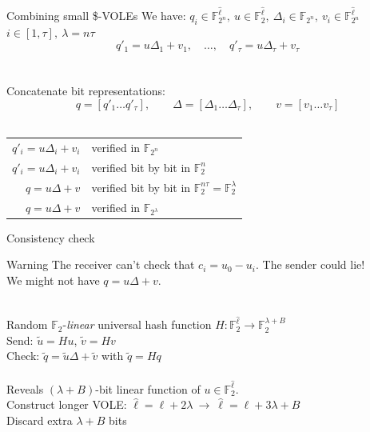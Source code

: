\begin{frame}{Combining small \$-VOLEs}
  We have: $q_i\in \mathbb{F}_{2^n}^{\hat{\ell}},\ u\in \mathbb{F}_2^{\hat{\ell}},\ \Delta_i\in \mathbb{F}_{2^n},\ v_i\in \mathbb{F}_{2^n}^{\hat{\ell}}$
  \hfill $i\in [1,\tau],\ \lambda=n\tau$\\
  $$q'_1=u\Delta_1+v_1,\quad\ldots,\quad q'_\tau=u\Delta_\tau+v_\tau$$
  \ \\\ \\\pause
  Concatenate bit representations:
  \vspace{-1em}
  $$q=[q'_1\ldots q'_\tau],\qquad\Delta=[\Delta_1\ldots\Delta_\tau],\qquad v=[v_1\ldots v_\tau]$$
  \ \\[1em]\pause
  \begin{center}
    \begin{tabular}{rl}
      $q'_i=u\Delta_i+v_i$ & verified in $\mathbb{F}_{2^n}$\\
      \pause
      $q'_i=u\Delta_i+v_i$ & verified bit by bit in $\mathbb{F}_2^n$\\
      \pause
      $q=u\Delta+v$ & verified bit by bit in $\mathbb{F}_2^{n\tau}=\mathbb{F}_2^\lambda$\\
      \pause
      $q=u\Delta+v$ & verified in $\mathbb{F}_{2^\lambda}$\\
    \end{tabular}
  \end{center}
\end{frame}


\begin{frame}{Consistency check}
  \begin{alertblock}{Warning}
    The receiver can't check that $c_i=u_0-u_i$.
    The sender could lie!\\
    We might not have $q=u\Delta+v$.
  \end{alertblock}
  \pause
  \ \\
  Random $\mathbb{F}_2$-\emph{linear} universal hash function $H:\mathbb{F}_2^{\hat{\ell}}\to\mathbb{F}_2^{\lambda+B}$\hfill{}\\
  Send: $\tilde{u}=Hu$, $\tilde{v}=Hv$ \\
  Check: $\tilde{q}=\tilde{u}\Delta+\tilde{v}$ with $\tilde{q}=Hq$\\
  \pause
  \ \\
  Reveals $(\lambda+B)$-bit linear function of $u\in \mathbb{F}_2^{\hat{\ell}}$.\\
  Construct longer VOLE: $\hat{\ell}=\ell+2\lambda\ \rightarrow\ \hat{\ell}=\ell+3\lambda+B$\\
  Discard extra $\lambda+B$ bits
\end{frame}
